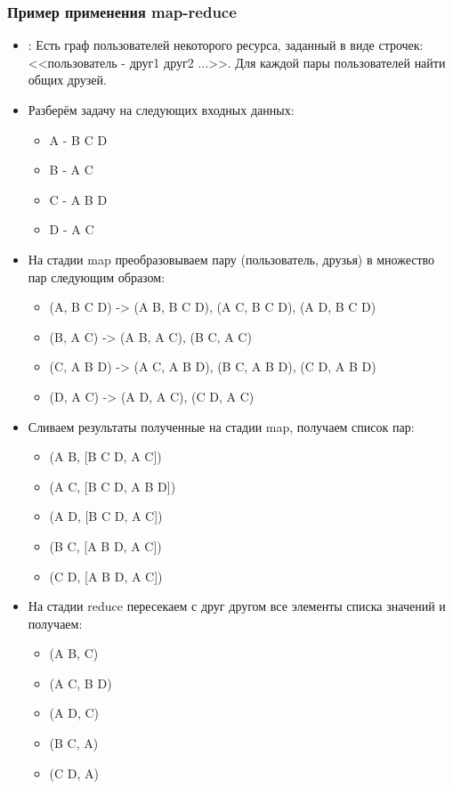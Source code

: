 \documentclass[12pt,a4paper,oneside]{extarticle}
\begin{document}
        \subsubsection{Пример применения map-reduce}
            \begin{itemize}
                \item {:} Есть граф пользователей некоторого ресурса, заданный в виде строчек: <<пользователь - друг1 друг2 ...>>. Для каждой пары пользователей найти общих друзей.
                \item Разберём задачу на следующих входных данных: \\
                    \begin{itemize}
                        \item A - B C D
                        \item B - A C
                        \item C - A B D
                        \item D - A C
                    \end{itemize}          
                \item На стадии map преобразовываем пару (пользователь, друзья) в множество пар следующим образом:
                \begin{itemize}
                    \item (A, B C D) -> (A B, B C D), (A C, B C D), (A D, B C D)
                    \item (B, A C) -> (A B, A C), (B C, A C)
                    \item (C, A B D) -> (A C, A B D), (B C, A B D), (C D, A B D)
                    \item (D, A C) -> (A D, A C), (C D, A C)
                \end{itemize}
                \item Сливаем результаты полученные на стадии map, получаем список пар:
                \begin{itemize}
                    \item (A B, [B C D, A C])
                    \item (A C, [B C D, A B D])
                    \item (A D, [B C D, A C])
                    \item (B C, [A B D, A C])
                    \item (C D, [A B D, A C])
                \end{itemize}
                \item На стадии reduce пересекаем с друг другом все элементы списка значений и получаем:
                \begin{itemize}
                    \item (A B, C)
                    \item (A C, B D)
                    \item (A D, C)
                    \item (B C, A)
                    \item (C D, A)
                \end{itemize}
            \end{itemize}
    \clearpage
\end{document}
